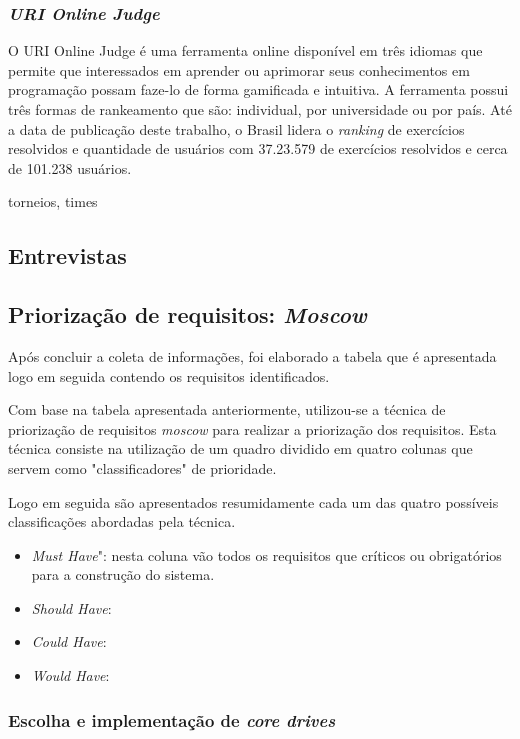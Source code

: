 \subsubsection{\textit{URI Online Judge}}
O URI Online Judge é uma ferramenta online disponível em três idiomas que permite que interessados em aprender ou
aprimorar seus conhecimentos em programação possam faze-lo de forma gamificada e intuitiva. A ferramenta possui três
formas de rankeamento que são: individual, por universidade ou por país. Até a data de publicação deste trabalho, o Brasil
lidera o \textit{ranking} de exercícios resolvidos e quantidade de usuários com 37.23.579 de exercícios resolvidos e cerca
de 101.238 usuários. \cite{URI} 

torneios, times


\subsection{Entrevistas}



\subsection{Priorização de requisitos: \textit{Moscow}}
Após concluir a coleta de informações, foi elaborado a tabela que é apresentada logo em seguida contendo os requisitos
identificados.


Com base na tabela apresentada anteriormente, utilizou-se a técnica de priorização de requisitos \textit{moscow} para realizar
a priorização dos requisitos. Esta técnica consiste na utilização de um quadro dividido em quatro colunas que servem como "classificadores"
de prioridade.

Logo em seguida são apresentados resumidamente cada um das quatro possíveis classificações abordadas pela técnica.
\begin{itemize}
	\item  \textit{Must Have}": nesta coluna vão todos os requisitos que críticos ou obrigatórios para a construção do sistema.
	\item  \textit{Should Have}:
	\item \textit{Could Have}:
	\item \textit{Would Have}:

\end{itemize}


\subsubsection{Escolha e implementação de \textit{core drives}}


